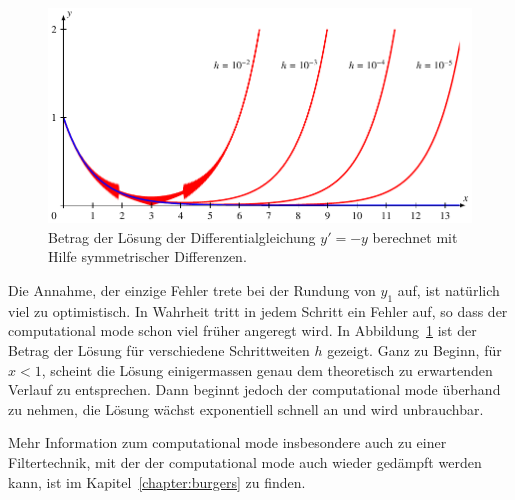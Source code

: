 \begin{figure}
\centering
\includegraphics{chapters/70-pde/experiments/computationalmode.pdf}
\caption{Betrag der Lösung der Differentialgleichung $y'=-y$ berechnet
mit Hilfe symmetrischer Differenzen.
\label{buch:pde:cm:fig}}
\end{figure}
Die Annahme, der einzige Fehler trete bei der Rundung von $y_1$ auf,
ist natürlich viel zu optimistisch.
In Wahrheit tritt in jedem Schritt ein Fehler auf, so dass der 
computational mode schon viel früher angeregt wird.
In Abbildung~\ref{buch:pde:cm:fig} ist der Betrag der Lösung
für verschiedene Schrittweiten $h$ gezeigt.
Ganz zu Beginn, für $x<1$, scheint die Lösung einigermassen genau dem
theoretisch zu erwartenden Verlauf zu entsprechen.
Dann beginnt jedoch der computational mode überhand zu nehmen,
die Lösung wächst exponentiell schnell an und wird unbrauchbar.
%

Mehr Information zum computational mode insbesondere auch zu einer
Filtertechnik, mit der der computational mode auch wieder gedämpft
werden kann, ist im Kapitel~\ref{chapter:burgers} zu finden.
%
%






